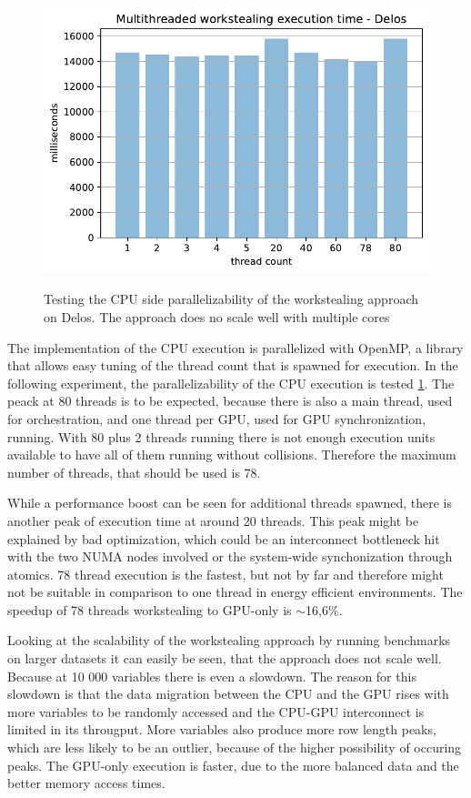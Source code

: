 \begin{figure}[H]
  \caption{Testing the CPU side parallelizability of the workstealing approach on Delos. The approach does no scale well with multiple cores}
  \includegraphics[width=\textwidth]{figures/threaded_wsteal.pdf}
  \centering
  \label{fig:wstealing_threaded_delos}
\end{figure}

The implementation of the CPU execution is parallelized with OpenMP, a library that allows easy tuning of the thread count that is spawned for execution. In the following experiment, the parallelizability of the CPU execution is tested \ref{fig:wstealing_threaded_delos}.
The peack at 80 threads is to be expected, because there is also a main thread, used for orchestration, and one thread per GPU, used for GPU synchronization, running. With 80 plus 2 threads running there is not enough execution units available to have all of them running without collisions. Therefore the maximum number of threads, that should be used is 78.

While a performance boost can be seen for additional threads spawned, there is another peak of execution time at around 20 threads. This peak might be explained by bad optimization, which could be an interconnect bottleneck hit with the two NUMA nodes involved or the system-wide synchonization through atomics. 78 thread execution is the fastest, but not by far and therefore might not be suitable in comparison to one thread in energy efficient environments. The speedup of 78 threads workstealing to GPU-only is $\sim$16,6\%.



Looking at the scalability of the workstealing approach by running benchmarks on larger datasets it can easily be seen, that the approach does not scale well. Because at 10 000 variables there is even a slowdown. The reason for this slowdown is that the data migration between the CPU and the GPU rises with more variables to be randomly accessed and the CPU-GPU interconnect is limited in its througput. More variables also produce more row length peaks, which are less likely to be an outlier, because of the higher possibility of occuring peaks.
The GPU-only execution is faster, due to the more balanced data and the better memory access times.

